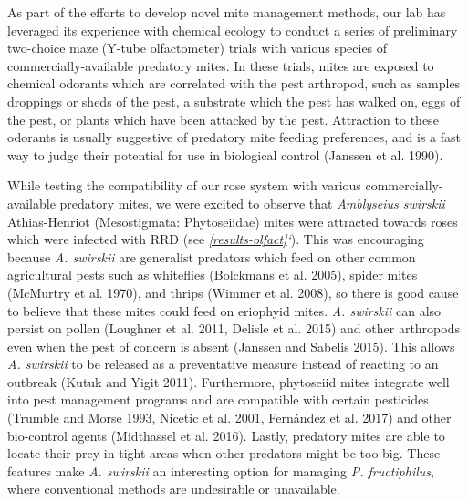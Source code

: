 \documentclass[12pt,final,CPage]{ufthesis}
\begin{document}
{  As part of the efforts to develop novel mite management methods, our lab has leveraged its experience with chemical ecology to conduct a series of preliminary two-choice maze (Y-tube olfactometer) trials with various species of commercially-available predatory mites. In these trials, mites are exposed to chemical odorants which are correlated with the pest arthropod, such as samples droppings or sheds of the pest, a substrate which the pest has walked on, eggs of the pest, or plants which have been attacked by the pest. Attraction to these odorants is usually suggestive of predatory mite feeding preferences, and is a fast way to judge their potential for use in biological control (Janssen et al. 1990).

  While testing the compatibility of our rose system with various commercially-available predatory mites, we were excited to observe that \emph{Amblyseius swirskii} Athias-Henriot (Mesostigmata: Phytoseiidae) mites were attracted towards roses which were infected with RRD (see \emph{\ref{results-olfact}`}). This was encouraging because \emph{A. swirskii} are generalist predators which feed on other common agricultural pests such as whiteflies (Bolckmans et al. 2005), spider mites (McMurtry et al. 1970), and thrips (Wimmer et al. 2008), so there is good cause to believe that these mites could feed on eriophyid mites. \emph{A. swirskii} can also persist on pollen (Loughner et al. 2011, Delisle et al. 2015) and other arthropods even when the pest of concern is absent (Janssen and Sabelis 2015). This allows \emph{A. swirskii} to be released as a preventative measure instead of reacting to an outbreak (Kutuk and Yigit 2011). Furthermore, phytoseiid mites integrate well into pest management programs and are compatible with certain pesticides (Trumble and Morse 1993, Nicetic et al. 2001, Fernández et al. 2017) and other bio-control agents (Midthassel et al. 2016). Lastly, predatory mites are able to locate their prey in tight areas when other predators might be too big. These features make \emph{A. swirskii} an interesting option for managing \emph{P. fructiphilus}, where conventional methods are undesirable or unavailable.

}
\end{document}

